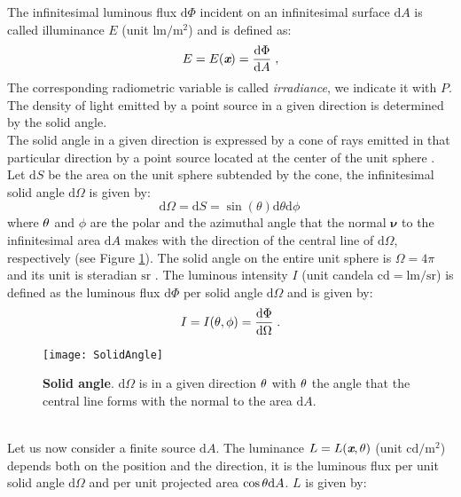 The infinitesimal luminous flux $\textrm{d}\Phi$ incident on an infinitesimal surface $\textrm{d}A$ is called illuminance $E$ (unit $\textrm{lm}/\textrm{m}^2$)
and is defined as:
\begin{equation}
 E=E(\textit{\textbf{x}}) = \frac{\textrm{d}\Phi}{\textrm{d}A}\;,
 \end{equation}
The corresponding radiometric variable is called \textit{irradiance}, we indicate it with $P$. The density of light emitted by a point source in a given direction is determined by the solid angle.\\ \indent
The solid angle in a given direction is expressed by a cone of rays emitted in that particular direction by a point source located at the center of the unit sphere \cite{koshel2012illumination}. 
Let $\textrm{d}S$ be the area on the unit sphere subtended by the cone,
the infinitesimal solid angle $\textrm{d}\Omega$ is given by:
\begin{equation}\label{solid_angle}
\textrm{d}\Omega = \textrm{d}S= \sin(\theta)\textrm{d}\theta \textrm{d}\phi\,
\end{equation}
 where $\theta$ and $\phi$ are the polar and the azimuthal angle that the normal $\boldsymbol{\nu}$ to the infinitesimal area $\textrm{d}A$ makes with the direction of the central line of $\textrm{d}\Omega$, respectively (see Figure \ref{fig:rad}).
The solid angle on the entire unit sphere is $\Omega = 4\pi$ and its unit is steradian $\textrm{sr}$ \cite{arecchi2007field}.
The luminous intensity $I$ (unit candela $\textrm{cd}=\textrm{lm}/\textrm{sr}$) is defined as the luminous flux $\textrm{d}\Phi$ per solid angle
$\textrm{d}\Omega$ and is given by:
\begin{equation}\label{intensity}
I = I(\theta, \phi) = \frac{\textrm{d}\Phi}{\textrm{d}\Omega}\;.
\end{equation}
 \begin{figure}[h]
  \begin{center}
  \texttt{[image: SolidAngle]}
  \end{center}
  \caption{\textbf{Solid angle}. $\textrm{d}\Omega$ is in a given direction $\theta$ with $\theta$ the angle that the central line forms with the normal to the area $\textrm{d}A$.}
  \label{fig:rad}
  \end{figure}
\\ \indent Let us now consider a finite source $\textrm{d}A$.
The luminance $L = L(\textit{\textbf{x}}, \theta)$ (unit $\textrm{cd} / \textrm{m}^2$) depends both on the position and the direction, it is the luminous flux per unit solid angle $\textrm{d}\Omega$ and  per unit projected area $\cos\theta \textrm{d}A$.  $L$  is given by:
